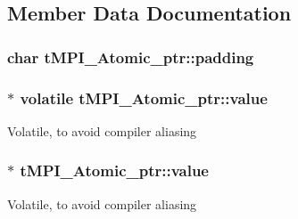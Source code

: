 \subsection{\-Member \-Data \-Documentation}
\hypertarget{structtMPI__Atomic__ptr_ab284a1cde6faf2adf673ae288f47a63c}{
\subsubsection[{padding}]{\setlength{\rightskip}{0pt plus 5cm}char {\bf t\-M\-P\-I\-\_\-\-Atomic\-\_\-ptr\-::padding}}}\label{structtMPI__Atomic__ptr_ab284a1cde6faf2adf673ae288f47a63c}
\hypertarget{structtMPI__Atomic__ptr_a6a3c46cb46c82ac81755969a44b09bba}{
\subsubsection[{value}]{$\ast$ volatile {\bf t\-M\-P\-I\-\_\-\-Atomic\-\_\-ptr\-::value}}}\label{structtMPI__Atomic__ptr_a6a3c46cb46c82ac81755969a44b09bba}
\-Volatile, to avoid compiler aliasing \hypertarget{structtMPI__Atomic__ptr_a44cda5cb05ffffd06dd44f495000ef55}{
\subsubsection[{value}]{ $\ast$ {\bf t\-M\-P\-I\-\_\-\-Atomic\-\_\-ptr\-::value}}}\label{structtMPI__Atomic__ptr_a44cda5cb05ffffd06dd44f495000ef55}
\-Volatile, to avoid compiler aliasing

